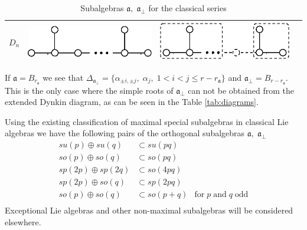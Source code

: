 \documentclass[12pt]{iopart}
\begin{document}
\begin{table}[ph]
{\begin{tabular}{|l|l|l|l|}
  $D_n$ & \includegraphics{table1_4(l).eps} & \includegraphics{table1_4(r).eps} \\
  \hline
\end{tabular}
\caption{Subalgebras $\mathfrak{a},\; \mathfrak{a}_{\bot}$ for the classical series}}
\end{table}
If $\mathfrak{a}=B_{r_{\mathfrak{a}}}$  we see that $\Delta_{\mathfrak{a}_{\bot}}=\{\alpha_{\pm i,\pm j},\;\alpha_j,\; 1<i<j\leq r-r_{\mathfrak{a}}\}$ and $\mathfrak{a}_{\bot}=B_{r-r_{\mathfrak{a}}}$. This is the only case where the simple roots of $\mathfrak{a}_{\bot}$ can not be obtained from the extended Dynkin diagram, as can be seen in the Table \ref{tab:diagrams}.
  
Using the existing classification of maximal special subalgebras in classical Lie algebras \cite{dynkin1952semisimple} we have the following pairs of the orthogonal subalgebras $\mathfrak{a},\;\mathfrak{a}_{\bot}$
\begin{equation}
  \label{eq:42}
  \begin{array}{lll}
      su(p)\oplus su(q) & \subset su(pq) &\\
      so(p)\oplus so(q) & \subset so(pq) &\\
      sp(2p)\oplus sp(2q) & \subset so(4pq)&\\
      sp(2p)\oplus so(q) & \subset sp(2pq)&\\
      so(p)\oplus so(q) & \subset so(p+q)& \mbox{for}\;p\;\mbox{and}\;q\;\mbox{odd}\\
  \end{array}
\end{equation}
Exceptional Lie algebras and other non-maximal subalgebras will be considered elsewhere.
\end{document}
